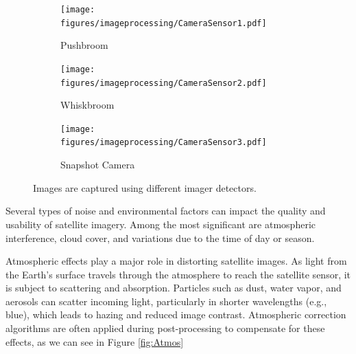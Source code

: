 \begin{figure}[H]
    \centering
    \begin{subfigure}[b]{0.45\linewidth}
        \centering
        \texttt{[image: figures/imageprocessing/CameraSensor1.pdf]}
        \caption{Pushbroom}
        \label{fig:Pushbroom}
    \end{subfigure}
    \hfill
    \begin{subfigure}[b]{0.45\linewidth}
        \centering
        \texttt{[image: figures/imageprocessing/CameraSensor2.pdf]}
        \caption{Whiskbroom}
        \label{fig:Whiskbroom}
    \end{subfigure}

    \par\bigskip %

    \begin{subfigure}[b]{0.4\linewidth}
        \centering
        \texttt{[image: figures/imageprocessing/CameraSensor3.pdf]}
        \caption{Snapshot Camera}
        \label{fig:Snapshot}
    \end{subfigure}

    \caption{Images are captured using different imager detectors.}
    \label{fig:Detectors}
\end{figure}


Several types of noise and environmental factors can impact the quality and usability of satellite imagery. Among the most significant are 
atmospheric interference, cloud cover, and variations due to the time of day or season.
\vspace{0.5cm}

\noindent
Atmospheric effects play a major role in distorting satellite images. As light from the Earth's surface travels through the 
atmosphere to reach the satellite sensor, it is subject to scattering and absorption. Particles such as dust, water vapor, and aerosols can 
scatter incoming light, particularly in shorter wavelengths (e.g., blue), which leads to hazing and reduced image contrast. Atmospheric correction 
algorithms are often applied during post-processing to compensate for these effects, as we can see in Figure \ref{fig:Atmos} \cite{Atmos, Dove}
\vspace{0.5cm}


